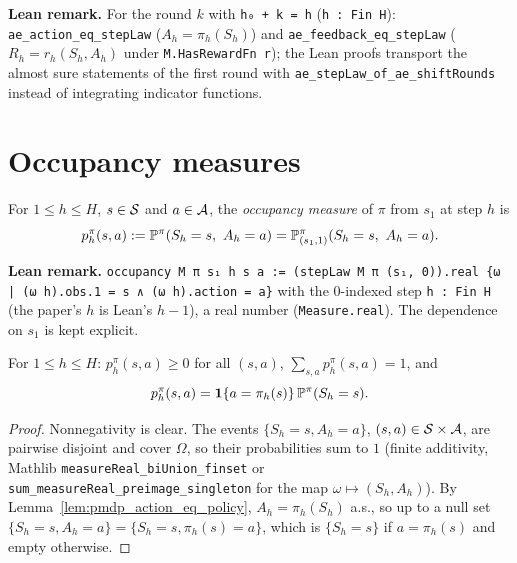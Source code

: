 \textbf{Lean remark.} For the round $k$ with \texttt{h₀ + k = h} (\texttt{h : Fin H}):
\texttt{ae\_action\_eq\_stepLaw} ($A_h = \pi_h(S_h)$) and \texttt{ae\_feedback\_eq\_stepLaw}
($R_h = r_h(S_h, A_h)$ under \texttt{M.HasRewardFn r}); the Lean proofs transport the almost sure
statements of the first round with \texttt{ae\_stepLaw\_of\_ae\_shiftRounds} instead of integrating
indicator functions.

\section{Occupancy measures}
\label{sec:pre_mdp_occupancy}

\begin{definition}\label{def:occupancy}
\leanok
{}
For $1 \le h \le H$, $s \in \mathcal{S}$ and $a \in \mathcal{A}$, the \emph{occupancy measure} of $\pi$ from
$s_1$ at step $h$ is
\[
  p^\pi_h(s, a) := \mathbb{P}^\pi(S_h = s,\ A_h = a) = \mathbb{P}^\pi_{(s_1,1)}(S_h = s,\ A_h = a) .
\]
\end{definition}

\textbf{Lean remark.} \texttt{occupancy M π s₁ h s a := (stepLaw M π (s₁, 0)).real \{ω | (ω h).obs.1 = s ∧ (ω h).action = a\}}
with the $0$-indexed step \texttt{h : Fin H} (the paper's $h$ is Lean's $h - 1$), a real number
(\texttt{Measure.real}). The dependence on $s_1$ is kept explicit.

\begin{lemma}\label{lem:occupancy_sum_one}
\leanok
{}
For $1 \le h \le H$: $p^\pi_h(s,a) \ge 0$ for all $(s, a)$, $\sum_{s,a} p^\pi_h(s,a) = 1$, and
\[
  p^\pi_h(s, a) = \mathbf{1}\{a = \pi_h(s)\}\,\mathbb{P}^\pi(S_h = s) .
\]
\end{lemma}

\begin{proof}
\leanok
Nonnegativity is clear. The events $\{S_h = s, A_h = a\}$, $(s, a) \in \mathcal{S} \times \mathcal{A}$, are
pairwise disjoint and cover $\Omega$, so their probabilities sum to $1$ (finite additivity,
Mathlib \texttt{measureReal\_biUnion\_finset} or \texttt{sum\_measureReal\_preimage\_singleton}
for the map $\omega \mapsto (S_h, A_h)$). By Lemma~\ref{lem:pmdp_action_eq_policy},
$A_h = \pi_h(S_h)$ a.s., so up to a null set $\{S_h = s, A_h = a\} = \{S_h = s, \pi_h(s) = a\}$,
which is $\{S_h = s\}$ if $a = \pi_h(s)$ and empty otherwise.
\end{proof}

